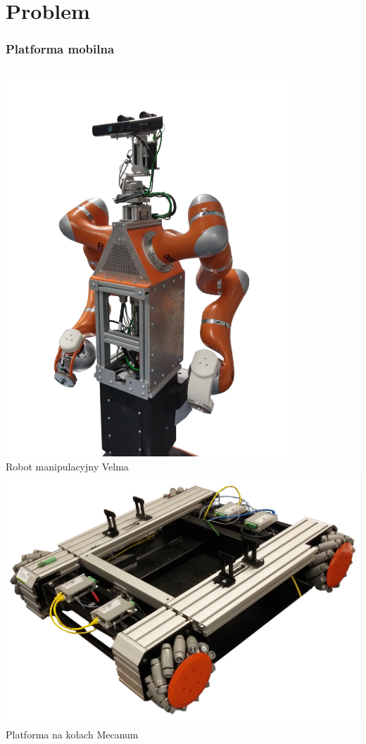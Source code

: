 \documentclass{beamer}
\begin{document}
	\section{Problem}
	\begin{frame}
		\frametitle{Platforma mobilna}
		\begin{columns}[c]
			\centering
			\includegraphics[width=0.8\textwidth]{graphics/velma.png} \\
			Robot manipulacyjny Velma
			\centering
			\includegraphics[width=\textwidth]{graphics/omnivelma.png} \\
			Platforma na kołach Mecanum
		\end{columns}
	\end{frame}
	
\end{document}
